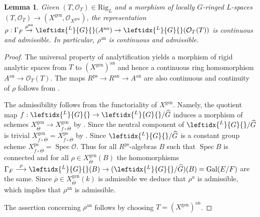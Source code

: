 \documentclass{amsart}
\newtheorem{lem}[prop]{Lemma}
\theoremstyle{definition}
\theoremstyle{remark}
\DeclareMathOperator{\Gal}{Gal}
\DeclareMathOperator{\Spec}{Spec}
\newcommand{\OO}{\mathcal O}
\newcommand{\ana}{\mathrm{an}}
\newcommand{\rhobar}{\overline{\rho}}
\newcommand{\gen}{\mathrm{gen}}
\newcommand{\Thetabar}{\overline{\Theta}}
\newcommand{\ps}{\mathrm{ps}}
\newcommand{\Ghat}{\widehat{G}}
\newcommand{\LG}{\leftidx{^L}{G}{}}
\newcommand{\Rig}{\mathrm{Rig}}
\begin{document}
\begin{lem}\label{cont_adm} Given $(T, \OO_T)\in \Rig_L$ and a morphism of locally $G$-ringed $L$-spaces $(T, \OO_T)\rightarrow
(X^{\gen}, \OO_{X^{\gen}})$, the representation 
$\rho: \Gamma_F\overset{\rho^{\ana}}{\rightarrow} \LG(A^{\ana})\rightarrow \LG(\OO_T(T))$ is continuous and admissible. In particular, $\rho^{\ana}$ is continuous and admissible. 
\end{lem} 
\begin{proof} The universal property of analytification  yields a morphism of rigid analytic spaces 
from $T$ to $(X^{\gen})^{\ana}$ and hence a continuous 
ring homomorphism $A^{\ana}\rightarrow \OO_T(T)$. 
The maps $R^{\ps}\rightarrow R^{\ana}\rightarrow A^{\ana}$ are also continuous and continuity of $\rho$ follows from 
\cite[Lemma 5.10 (2), Proposition 8.3]{defG}.

The admissibility follows from the functoriality of 
$X^{\gen}$. Namely, the quotient map $f: \LG\rightarrow \LG/\Ghat$ induces a morphism of schemes $X^{\gen}_{\Thetabar} \rightarrow X^{\gen}_{f\circ \Thetabar}$ by \cite[Proposition 8.5]{defG}. Since
the neutral component of $\LG/\Ghat$
is trivial $X^{\gen}_{f\circ \Thetabar}= X^{\ps}_{f\circ \Thetabar}$ by . Since $\LG/\Ghat$ is a constant group
scheme $X^{\ps}_{f\circ \Thetabar}=\Spec \OO$.
Thus
for all $R^{\ps}$-algebras $B$ such that $\Spec B$ 
is connected and for all $\rho\in X^{\gen}_{\Thetabar}(B)$ the homomorphisms $\Gamma_F\overset{\rho}{\longrightarrow}
\LG(B)\rightarrow (\LG/\Ghat)(B)=\Gal(E/F)$ are the same. Since $\rhobar\in X^{\gen}_{\Thetabar}(k)$ is admissible we deduce that $\rho^u$ is admissible, which implies that $\rho^{\ana}$ is admissible.

The assertion concerning $\rho^{\ana}$ follows by choosing $T=(X^{\gen})^{\ana}$. 
\end{proof} 
\end{document}
